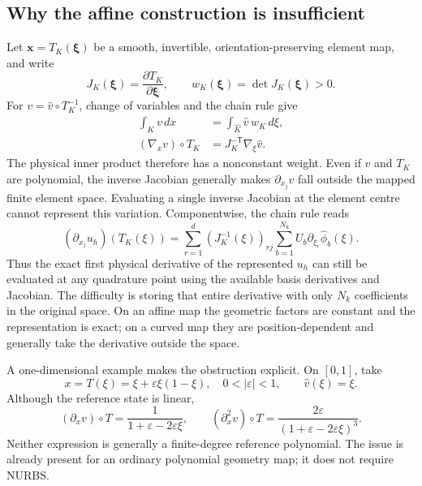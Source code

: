 \subsection{Why the affine construction is insufficient}
Let $\boldsymbol x=T_K(\boldsymbol\xi)$ be a smooth, invertible,
orientation-preserving element map, and write
\begin{equation}
 J_K(\boldsymbol\xi)=\frac{\partial T_K}{\partial\boldsymbol\xi},
 \qquad w_K(\boldsymbol\xi)=\det J_K(\boldsymbol\xi)>0.
 \label{eq:curved-jacobian}
\end{equation}
For $v=\widehat v\circ T_K^{-1}$, change of variables and the chain rule give
\begin{align}
 \int_K v\,dx&=\int_{\widehat K}\widehat v\,w_K\,d\xi,
 \label{eq:curved-change-variables}\\
 (\nabla_xv)\circ T_K&=J_K^{-\mathsf T}\nabla_\xi\widehat v.
 \label{eq:curved-chain-rule}
\end{align}
The physical inner product therefore has a nonconstant weight. Even if
$\widehat v$ and $T_K$ are polynomial, the inverse Jacobian generally makes
$\partial_{x_j}v$ fall outside the mapped finite element space. Evaluating a
single inverse Jacobian at the element centre cannot represent this variation.
Componentwise, the chain rule reads
\begin{equation}
 (\partial_{x_j}u_h)(T_K(\xi))
 =\sum_{r=1}^{d}(J_K^{-1}(\xi))_{rj}
                  \sum_{b=1}^{N_k}U_b\partial_{\xi_r}\widehat\phi_b(\xi).
\end{equation}
Thus the exact first physical derivative of the represented $u_h$ can still
be evaluated at any quadrature point using the available basis derivatives
and Jacobian. The difficulty is storing that entire derivative with only
$N_k$ coefficients in the original space. On an affine map the geometric
factors are constant and the representation is exact; on a curved map they
are position-dependent and generally take the derivative outside the space.

A one-dimensional example makes the obstruction explicit. On $[0,1]$, take
\begin{equation}
 x=T(\xi)=\xi+\varepsilon\xi(1-\xi),\quad
 0<|\varepsilon|<1,\qquad \widehat v(\xi)=\xi.
\end{equation}
Although the reference state is linear,
\begin{equation}
 (\partial_xv)\circ T=\frac{1}{1+\varepsilon-2\varepsilon\xi},\qquad
 (\partial_x^2v)\circ T=
 \frac{2\varepsilon}{(1+\varepsilon-2\varepsilon\xi)^3}.
 \label{eq:curved-derivative-example}
\end{equation}
Neither expression is generally a finite-degree reference polynomial. The
issue is already present for an ordinary polynomial geometry map; it does not
require NURBS.

